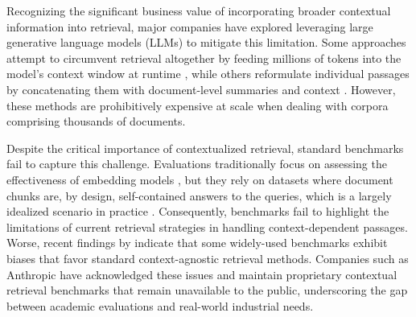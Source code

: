 Recognizing the significant business value of incorporating broader contextual information into retrieval, major companies have explored leveraging large generative language models (LLMs) to mitigate this limitation. Some approaches attempt to circumvent retrieval altogether by feeding millions of tokens into the model's context window at runtime , while others reformulate individual passages by concatenating them with document-level summaries and context . However, these methods are prohibitively expensive at scale when dealing with corpora comprising thousands of documents.


Despite the critical importance of contextualized retrieval, standard benchmarks fail to capture this challenge. Evaluations traditionally focus on assessing the effectiveness of embedding models , but they rely on datasets where document chunks are, by design, self-contained answers to the queries, which is a largely idealized scenario in practice . Consequently, benchmarks fail to highlight the limitations of current retrieval strategies in handling context-dependent passages. Worse, recent findings by  indicate that some widely-used benchmarks exhibit biases that favor standard context-agnostic retrieval methods. Companies such as Anthropic have acknowledged these issues and maintain proprietary contextual retrieval benchmarks that remain unavailable to the public, underscoring the gap between academic evaluations and real-world industrial needs.



%


